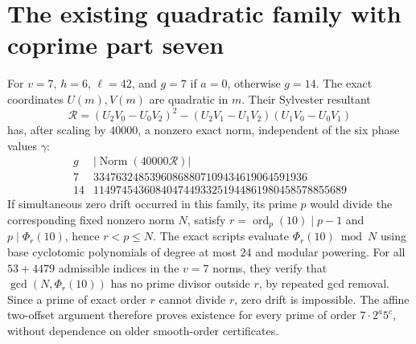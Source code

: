 \documentclass[10pt]{article}
\DeclareMathOperator{\ord}{ord}
\DeclareMathOperator{\Norm}{Norm}
\begin{document}
\section{The existing quadratic family with coprime part seven}
For \(v=7\), \(h=6\), \(\ell=42\), and
\(g=7\) if \(a=0\), otherwise \(g=14\).
The exact coordinates \(U(m),V(m)\) are quadratic in \(m\).
Their Sylvester resultant
\[
\mathcal R=(U_2V_0-U_0V_2)^2-
  (U_2V_1-U_1V_2)(U_1V_0-U_0V_1)
\]
has, after scaling by \(40000\), a nonzero exact norm,
independent of the six phase values \(\gamma\):
\[
\begin{array}{c|l}
g&|\Norm(40000\mathcal R)|\\\hline
7&33476324853960868807109434619064591936\\
14&114974543608404744933251944861980458578855689
\end{array}
\]
If simultaneous zero drift occurred in this family,
its prime \(p\) would divide the corresponding fixed nonzero
norm \(N\), satisfy \(r=\ord_p(10)\mid p-1\) and
\(p\mid\Phi_r(10)\), hence \(r<p\le N\).
The exact scripts evaluate \(\Phi_r(10)\bmod N\) using
base cyclotomic polynomials of degree at most \(24\)
and modular powering. For all \(53+4479\) admissible indices
in the \(v=7\) norms, they verify that
\(\gcd(N,\Phi_r(10))\) has no prime divisor outside \(r\),
by repeated gcd removal. Since a prime of exact order \(r\)
cannot divide \(r\), zero drift is impossible.
The affine two-offset argument therefore proves existence for every
prime of order \(7\cdot2^a5^c\), without dependence on older smooth-order
certificates.
\end{document}
